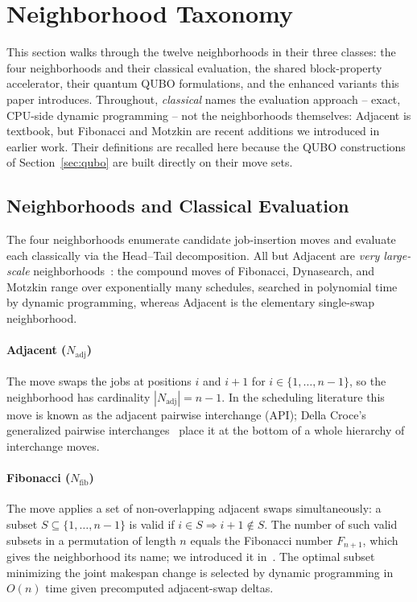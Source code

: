 \documentclass[preprint,12pt,authoryear]{elsarticle}
\begin{document}
\section{Neighborhood Taxonomy}
\label{sec:neighborhoods}

This section walks through the twelve neighborhoods in their three
classes: the four neighborhoods and their classical evaluation, the
shared block-property accelerator, their quantum QUBO formulations, and
the enhanced variants this paper introduces. Throughout, \emph{classical}
names the evaluation approach -- exact, CPU-side dynamic programming --
not the neighborhoods themselves: Adjacent is textbook, but Fibonacci
and Motzkin are recent additions we introduced in earlier work. Their
definitions are recalled here because the QUBO constructions of
Section~\ref{sec:qubo} are built directly on their move sets.

\subsection{Neighborhoods and Classical Evaluation}

The four neighborhoods enumerate candidate job-insertion moves and
evaluate each classically via the Head--Tail decomposition. All but
Adjacent are \emph{very large-scale} neighborhoods~\citep{ahuja2002}:
the compound moves of Fibonacci, Dynasearch, and Motzkin range over
exponentially many schedules, searched in polynomial time by dynamic
programming, whereas Adjacent is the elementary single-swap
neighborhood.

\paragraph{Adjacent \textup{($N_{\mathrm{adj}}$)}}
The move swaps the jobs at positions $i$ and $i+1$ for
$i \in \{1,\ldots,n-1\}$, so the neighborhood has cardinality
$|N_{\mathrm{adj}}| = n-1$.
In the scheduling literature this move is known as the adjacent
pairwise interchange (API); Della Croce's generalized pairwise
interchanges~\citep{dellacroce95} place it at the bottom of a whole
hierarchy of interchange moves.

\paragraph{Fibonacci \textup{($N_{\mathrm{fib}}$)}}
The move applies a set of non-overlapping adjacent swaps
simultaneously: a subset $S \subseteq \{1,\ldots,n-1\}$ is valid if
$i \in S \Rightarrow i+1 \notin S$.
The number of such valid subsets in a permutation of length $n$ equals the
Fibonacci number $F_{n+1}$, which gives the neighborhood its
name; we introduced it in~\citep{WojewodzkiBozejko2026}.
The optimal subset minimizing the joint makespan change is selected by
dynamic programming in $O(n)$ time given precomputed adjacent-swap deltas.
\end{document}
